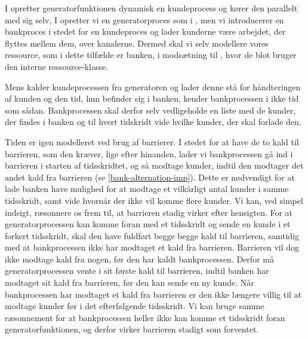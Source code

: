 I \simpy opretter generatorfunktionen dynamisk en kundeprocess og  kører den parallelt med sig selv,
I \pycsp opretter vi en generatorproces  som i \simpy, men vi introducerer en bankproces i stedet for en kundeproces og lader kunderne være arbejdet, der flyttes mellem dem, over kanalerne. Dermed skal vi selv modellere vores ressource, som i dette tilfælde er banken, i modsætning til \simpy, hvor de blot bruger den interne ressource-klasse.

Mens \simpy kalder kundeprocessen fra generatoren og lader denne stå for håndteringen af kunden 
og den tid, hun befinder sig i banken, kender bankprocessen i \pycsp ikke tid som 
sådan. Bankprocessen skal derfor selv vedligeholde en liste med de kunder, der findes i banken og til hvert 
tidskridt vide hvilke kunder, der skal forlade den. 

Tiden er igen modelleret ved brug af barrierer. I 
stedet for at have de to kald til barrieren, som den kræver, lige efter hinanden, lader 
vi bankprocessen gå ind i barrieren i starten af tidsskridtet, og så modtage 
kunder, indtil den modtager det andet kald fra barrieren (se \cref{bank-alternation-imp}). Dette er nødvendigt for at lade banken have 
mulighed for at modtage et vilkårligt antal kunder i samme tidsskridt, samt 
vide hvornår der ikke vil komme flere kunder.  Vi kan, ved simpel indsigt, ræsonnere os frem til, at 
barrieren stadig virker efter hensigten.
For at generatorprocessen kan komme foran med et tidsskridt og sende en kunde i et forkert tidsskridt,
skal den have fuldført begge begge kald til barrieren, samtidig med at bankprocessen ikke 
har modtaget et kald fra barrieren. Barrieren vil dog ikke modtage kald fra 
nogen, før den har  kaldt bankprocessen. Derfor må generatorprocessen vente i 
sit første kald til barrieren, indtil banken har modtaget sit kald fra 
barrieren, før den kan sende en ny kunde.
Når bankprocessen har modtaget et kald fra barrieren er den ikke længere villig 
til at modtage kunder før i det efterfølgende tidsskridt. Vi kan bruge samme 
ræsonnement for at bankprocessen heller ikke kan komme et 
tidsskridt foran generatorfunktionen, og derfor virker barrieren stadigt som 
forventet. 

